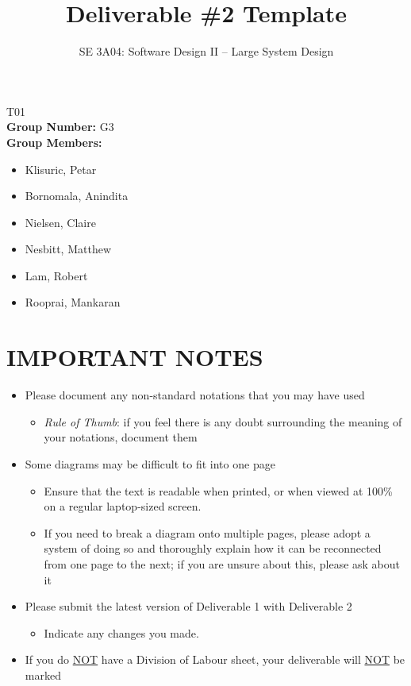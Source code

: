 \documentclass[]{article}
\title{Deliverable \#2 Template}
\author{SE 3A04: Software Design II -- Large System Design}
\date{}
\begin{document}
\maketitle	
{} T01\\
{\bf Group Number:} G3 \\
{\bf Group Members:} 
\begin{itemize}
    \item Klisuric, Petar
    \item Bornomala, Anindita
    \item Nielsen, Claire
    \item Nesbitt, Matthew
    \item Lam, Robert 
    \item Rooprai, Mankaran
\end{itemize}

\section*{IMPORTANT NOTES}
\begin{itemize}
	\item Please document any non-standard notations that you may have used
	\begin{itemize}
		\item \emph{Rule of Thumb}: if you feel there is any doubt surrounding the meaning of your notations, document them
	\end{itemize}
	\item Some diagrams may be difficult to fit into one page
	\begin{itemize}
		\item Ensure that the text is readable when printed, or when viewed at 100\% on a regular laptop-sized screen.
		\item If you need to break a diagram onto multiple pages, please adopt a system of doing so and thoroughly explain how it can be reconnected from one page to the next; if you are unsure about this, please ask about it
	\end{itemize}
	\item Please submit the latest version of Deliverable 1 with Deliverable 2
	\begin{itemize}
		\item Indicate any changes you made.
	\end{itemize}
	\item If you do \underline{NOT} have a Division of Labour sheet, your deliverable will \underline{NOT} be marked
\end{itemize}
\end{document}
